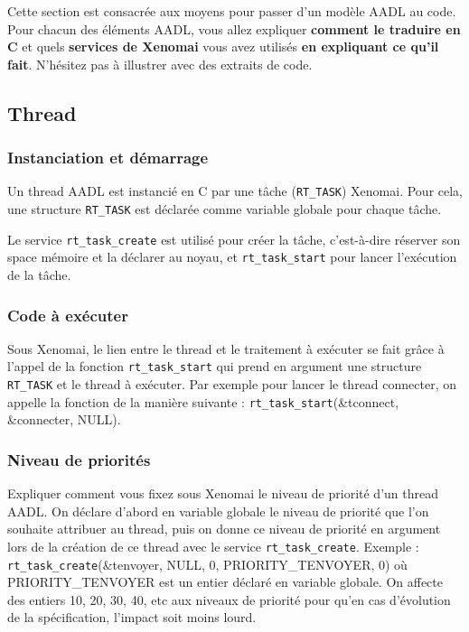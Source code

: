 \documentclass[11pt, a4paper]{paper}
\begin{document}
{ {\color{red} Cette section est consacrée aux moyens pour passer d'un modèle AADL au code. Pour chacun des éléments AADL, vous allez expliquer {\bf comment le traduire en C} et quels {\bf services de Xenomai} vous avez utilisés {\bf en expliquant ce qu'il fait}. N'hésitez pas à illustrer avec des extraits de code.}
 
\subsection{Thread}
\subsubsection{Instanciation et démarrage}
{\color{black} Un thread AADL est instancié en C par une tâche ({\tt RT\_TASK}) Xenomai.  Pour cela, une structure {\tt RT\_TASK} est déclarée comme variable globale pour chaque tâche.

Le service {\tt rt\_task\_create} est utilisé pour créer la tâche, c'est-à-dire réserver son space mémoire et la déclarer au noyau, et {\tt rt\_task\_start} pour lancer l'exécution de la tâche.}

\subsubsection{Code à exécuter}
 {\color{black} Sous Xenomai, le lien entre le thread et le traitement à exécuter se fait grâce à l'appel de la fonction {\tt rt\_task\_start} qui prend en argument une structure {\tt RT\_TASK} et le thread à exécuter. Par exemple pour lancer le thread connecter, on appelle la fonction de la manière suivante : {\tt rt\_task\_start}(\&tconnect, \&connecter, NULL).}

\subsubsection{Niveau de priorités}
 {\color{black} Expliquer comment vous fixez sous Xenomai le niveau de priorité d'un thread AADL. On déclare d'abord en variable globale le niveau de priorité que l'on souhaite attribuer au thread, puis on donne ce niveau de priorité en argument lors de la création de ce thread avec le service {\tt rt\_task\_create}}. Exemple : {\tt rt\_task\_create}(\&tenvoyer, NULL, 0, PRIORITY\_TENVOYER, 0) où PRIORITY\_TENVOYER est un entier déclaré en variable globale. On affecte des entiers 10, 20, 30, 40, etc aux niveaux de priorité pour qu'en cas d'évolution de la spécification, l'impact soit moins lourd.}
\end{document}
